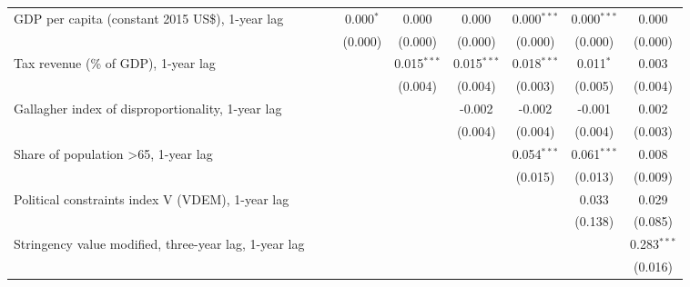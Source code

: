 \begin{table}[htbp]
\begin{tabular}{lcccccccc}
      GDP per capita (constant 2015 US\$), 1-year lag                       &         &         & 0.000$^{*}$ & 0.000         & 0.000         & 0.000$^{***}$ & 0.000$^{***}$ & 0.000\\   
                                                                            &         &         & (0.000)     & (0.000)       & (0.000)       & (0.000)       & (0.000)       & (0.000)\\   
      Tax revenue (\% of GDP), 1-year lag                                   &         &         &             & 0.015$^{***}$ & 0.015$^{***}$ & 0.018$^{***}$ & 0.011$^{*}$   & 0.003\\   
                                                                            &         &         &             & (0.004)       & (0.004)       & (0.003)       & (0.005)       & (0.004)\\   
      Gallagher index of disproportionality, 1-year lag                     &         &         &             &               & -0.002        & -0.002        & -0.001        & 0.002\\   
                                                                            &         &         &             &               & (0.004)       & (0.004)       & (0.004)       & (0.003)\\   
      Share of population >65, 1-year lag                                   &         &         &             &               &               & 0.054$^{***}$ & 0.061$^{***}$ & 0.008\\   
                                                                            &         &         &             &               &               & (0.015)       & (0.013)       & (0.009)\\   
      Political constraints index V (VDEM), 1-year lag                      &         &         &             &               &               &               & 0.033         & 0.029\\   
                                                                            &         &         &             &               &               &               & (0.138)       & (0.085)\\   
      Stringency value modified, three-year lag, 1-year lag                 &         &         &             &               &               &               &               & 0.283$^{***}$\\   
                                                                            &         &         &             &               &               &               &               & (0.016)\\   

\end{tabular}
\end{table}
